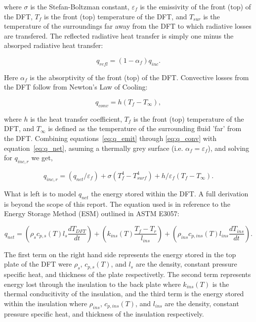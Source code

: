 \documentclass[article]{proc}
\begin{document}
    \noindent where $\sigma$ is the Stefan-Boltzman constant, $\varepsilon_f$ is the emissivity of the front (top) of the DFT, $T_f$ is the front (top) temperature of the DFT, and $T_{sur}$ is the temperature of the surroundings far away from the DFT to which radiative losses are transfered. The reflected radiative heat transfer is simply one minus the absorped radiative heat transfer:

    \begin{equation}\label{eq:q_refl}
        q_{refl} = (1 - \alpha_f)q_{inc}.
    \end{equation}

    \noindent Here $\alpha_f$ is the absorptivity of the front (top) of the DFT. Convective losses from the DFT follow from Newton's Law of Cooling:

    \begin{equation}\label{eq:q_conv}
        q_{conv} = h (T_f - T_{\infty}),
    \end{equation}

    \noindent where $h$ is the heat transfer coefficient, $T_f$ is the front (top) temperature of the DFT, and $T_{\infty}$ is defined as the temperature of the surrounding fluid 'far' from the DFT. Combining equations~\ref{eq:q_emit} through \ref{eq:q_conv} with equation~\ref{eq:q_net}, asuming a thermally grey surface (i.e. $\alpha_f = \varepsilon_f$), and solving for $q_{inc,r}$ we get,

    \begin{equation}\label{eq:q_inc}
        q_{inc,r} = (q_{net}/\varepsilon_f) + \sigma (T_f^4 - T_{surf}^4) + h/\varepsilon_f (T_f - T_{\infty}).
    \end{equation}

    What is left is to model $q_{net}$ the energy stored within the DFT. A full derivation is beyond the scope of this report. The equation used is in reference to the Energy Storage Method (ESM) outlined in ASTM E3057:

    \begin{equation}\label{eq:esm}
        q_{net} = \left(\rho_s c_{p,s}(T) l_s \frac{dT_{DFT}}{dt} \right) + \left( k_{ins}(T) \frac{T_f - T_r}{l_{ins}} \right) + \left(\rho_{ins} c_{p,ins}(T) l_{ins} \frac{dT_{ins}}{dt}\right).
    \end{equation}

    \noindent The first term on the right hand side represents the energy stored in the top plate of the DFT were $\rho_s$, $c_{p,s}(T)$, and $l_s$ are the density, constant pressure specific heat, and thickness of the plate respectivetly. The second term represents energy lost through the insulation to the back plate where $k_{ins}(T)$ is the thermal conducitivity of the insulation, and the third term is the energy stored within the insulation where $\rho_{ins}$, $c_{p,ins}(T)$, and $l_{ins}$ are the density, constant pressure specific heat, and thickness of the insulation respectively. 
\end{document}
